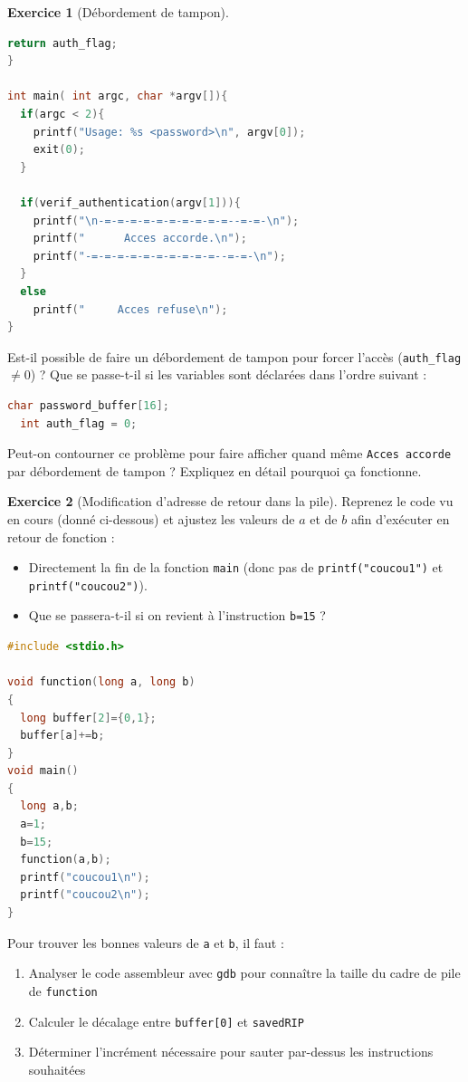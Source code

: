 \documentclass[a4paper,11pt]{article}
\theoremstyle{plain}
\theoremstyle{definition}
\newtheorem{exercice}{Exercice}
\begin{document}
\begin{exercice}[Débordement de tampon]
\begin{enumerate}
\begin{lstlisting}[language=C]
  return auth_flag;
}

int main( int argc, char *argv[]){
  if(argc < 2){
    printf("Usage: %s <password>\n", argv[0]);
    exit(0);
  }

  if(verif_authentication(argv[1])){
    printf("\n-=-=-=-=-=-=-=-=-=-=--=-=-\n");
    printf("      Acces accorde.\n");
    printf("-=-=-=-=-=-=-=-=-=-=--=-=-\n");
  }
  else
    printf("     Acces refuse\n");
}
\end{lstlisting}
Est-il possible de faire un débordement de tampon pour forcer l'accès (\texttt{auth\_flag} $\neq 0$) ? Que se passe-t-il si les variables sont déclarées dans l'ordre suivant :
\begin{lstlisting}[language=C,numbers=none]
  char password_buffer[16];
  int auth_flag = 0;
\end{lstlisting}
Peut-on contourner ce problème pour faire afficher quand même \texttt{Acces accorde} par débordement de tampon ? Expliquez en détail pourquoi ça fonctionne.
\end{enumerate}
\end{exercice}



\begin{exercice}[Modification d'adresse de retour dans la pile]
Reprenez le code vu en cours (donné ci-dessous) et ajustez les valeurs de $a$ et de $b$ afin d'exécuter en retour de fonction :
\begin{itemize}
\item Directement la fin de la fonction \texttt{main} (donc pas de \texttt{printf("coucou1")} et \texttt{printf("coucou2")}).
  \item Que se passera-t-il si on revient à l'instruction \texttt{b=15} ?
\end{itemize}

\begin{lstlisting}[language=C]
#include <stdio.h>

void function(long a, long b)
{
  long buffer[2]={0,1};
  buffer[a]+=b;
}
void main()
{
  long a,b;
  a=1;
  b=15;
  function(a,b);
  printf("coucou1\n");
  printf("coucou2\n");
}
\end{lstlisting}

\begin{rappel}
Pour trouver les bonnes valeurs de \texttt{a} et \texttt{b}, il faut :
\begin{enumerate}
    \item Analyser le code assembleur avec \texttt{gdb} pour connaître la taille du cadre de pile de \texttt{function}
    \item Calculer le décalage entre \texttt{buffer[0]} et \texttt{savedRIP}
    \item Déterminer l'incrément nécessaire pour sauter par-dessus les instructions souhaitées
\end{enumerate}
\end{rappel}
\end{exercice}
\end{document}
